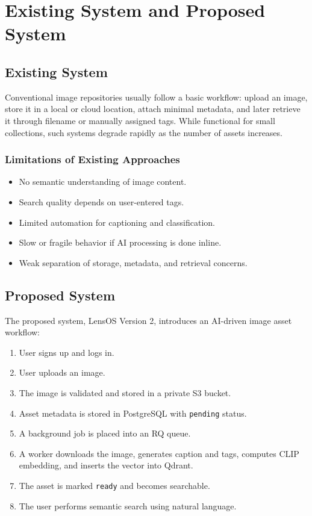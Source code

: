 \documentclass[12pt,a4paper]{report}
\begin{document}
\chapter{Existing System and Proposed System}
\section{Existing System}
Conventional image repositories usually follow a basic workflow: upload an image, store it in a local or cloud location, attach minimal metadata, and later retrieve it through filename or manually assigned tags. While functional for small collections, such systems degrade rapidly as the number of assets increases.

\subsection{Limitations of Existing Approaches}
\begin{itemize}[leftmargin=*]
    \item No semantic understanding of image content.
    \item Search quality depends on user-entered tags.
    \item Limited automation for captioning and classification.
    \item Slow or fragile behavior if AI processing is done inline.
    \item Weak separation of storage, metadata, and retrieval concerns.
\end{itemize}

\section{Proposed System}
The proposed system, LensOS Version 2, introduces an AI-driven image asset workflow:
\begin{enumerate}[leftmargin=*]
    \item User signs up and logs in.
    \item User uploads an image.
    \item The image is validated and stored in a private S3 bucket.
    \item Asset metadata is stored in PostgreSQL with \texttt{pending} status.
    \item A background job is placed into an RQ queue.
    \item A worker downloads the image, generates caption and tags, computes CLIP embedding, and inserts the vector into Qdrant.
    \item The asset is marked \texttt{ready} and becomes searchable.
    \item The user performs semantic search using natural language.
\end{enumerate}
\end{document}

